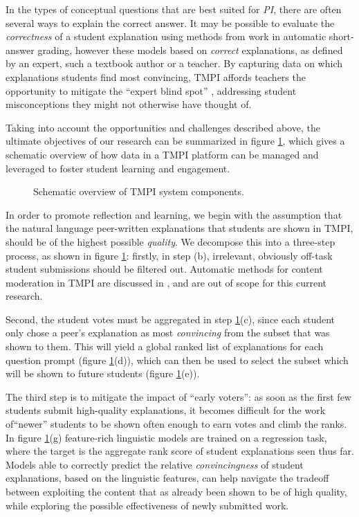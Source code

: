 \documentclass[notitlepage,12pt]{jedm}
\begin{document}
In the types of conceptual questions that are best suited for \textit{PI}, 
there are often several ways to explain the correct answer.
It may be possible to evaluate the \textit{correctness} of a student 
explanation using methods from work in automatic short-answer grading, however 
these models based on \textit{correct} explanations, as defined by an expert, 
such a textbook author or a teacher.
By capturing data on which explanations students find most convincing, 
TMPI affords teachers the opportunity to mitigate the ``expert blind spot'' 
\cite{nathan_expert_2001}, addressing student misconceptions they might not 
otherwise have thought of.

Taking into account the opportunities and challenges described above, the 
ultimate objectives of our research can be summarized in figure 
\ref{fig:tmpi_research}, which gives a schematic overview of how data in a TMPI 
platform can be managed and leveraged to foster student learning and engagement.
 
\begin{figure}[H]
	\centering
	\def\svgscale{0.70}
	
	\caption{
		Schematic overview of TMPI system components.
		 }
	\label{fig:tmpi_research}
\end{figure}

In order to promote reflection and learning, we begin with the assumption that 
the natural language peer-written explanations that students are shown in TMPI, 
should be of the highest possible \textit{quality}.
We decompose this into a three-step process, as shown in figure 
\ref{fig:tmpi_research}: firstly, in step (b), irrelevant, obviously off-task 
student submissions should be filtered out. 
Automatic methods for content moderation in TMPI are discussed in 
\cite{gagnon_filtering_2019}, and are out of scope for this current research.

Second, the student votes must be aggregated in step 
\ref{fig:tmpi_research}(c), since each student only chose a peer's explanation 
as most \textit{convincing} from the subset that was shown to them.
This will yield a global ranked list of explanations for each 
question prompt (figure \ref{fig:tmpi_research}(d)), which can then be used to 
select the subset which will be shown to future students (figure 
\ref{fig:tmpi_research}(e)).

The third step is to mitigate the impact of ``early voters'': as soon as the 
first few students submit high-quality explanations, it becomes difficult for 
the work of``newer'' students to be shown often enough to earn votes and climb 
the ranks.
In figure \ref{fig:tmpi_research}(g) feature-rich linguistic models are trained 
on a regression task, where the target is the aggregate rank score of student 
explanations seen thus far. 
Models able to correctly predict the relative \textit{convincingness} of 
student explanations, based on the linguistic features, can help navigate the 
tradeoff between exploiting the content that as already been shown to be of 
high quality, while exploring the possible effectiveness of newly submitted 
work.
\end{document}
